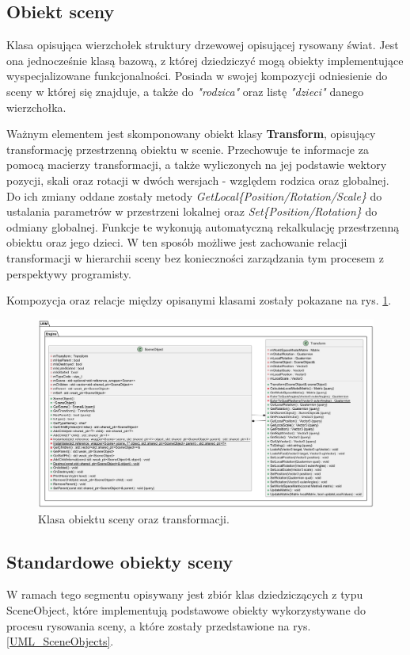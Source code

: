	
\subsection{Obiekt sceny}
	Klasa opisująca wierzchołek struktury drzewowej opisującej rysowany świat. Jest ona jednocześnie klasą bazową, z której dziedziczyć mogą obiekty implementujące wyspecjalizowane funkcjonalności. Posiada w swojej kompozycji odniesienie do sceny w której się znajduje, a także do \textit{"rodzica"} oraz listę \textit{"dzieci"} danego wierzchołka. 
	
	Ważnym elementem jest skomponowany obiekt klasy \textbf{Transform}, opisujący transformację przestrzenną obiektu w scenie. Przechowuje te informacje za pomocą macierzy transformacji, a także wyliczonych na jej podstawie wektory pozycji, skali oraz rotacji w dwóch wersjach - względem rodzica oraz globalnej. Do ich zmiany oddane zostały metody \textit{GetLocal\{Position/Rotation/Scale\}} do ustalania parametrów w przestrzeni lokalnej oraz \textit{Set\{Position/Rotation\}} do odmiany globalnej. Funkcje te wykonują automatyczną rekalkulację przestrzenną obiektu oraz jego dzieci. W ten sposób możliwe jest zachowanie relacji transformacji w hierarchii sceny bez konieczności zarządzania tym procesem z perspektywy programisty.
	
	Kompozycja oraz relacje między opisanymi klasami zostały pokazane na rys. \ref{UML_SceneObject}.
	
	\begin{figure}[h!]
		\centering
		\includegraphics[width=\textwidth]{images/UML/sceneobject.png}
		\caption{Klasa obiektu sceny oraz transformacji.}
		\label{UML_SceneObject}
	\end{figure}
	
\subsection{Standardowe obiekty sceny}
	W ramach tego segmentu opisywany jest zbiór klas dziedziczących z typu SceneObject, które implementują podstawowe obiekty wykorzystywane do procesu rysowania sceny, a które zostały przedstawione na rys. \ref{UML_SceneObjects}.
	
